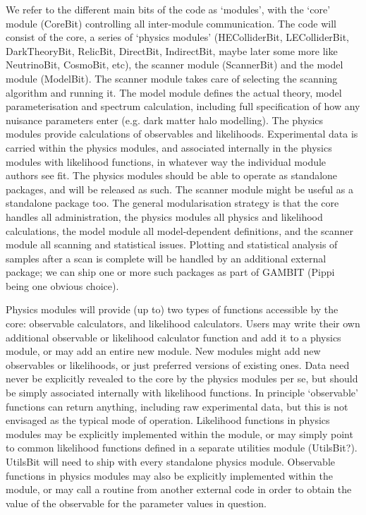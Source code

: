 We refer to the different main bits of the code as `modules', with the `core' module (CoreBit) controlling all inter-module communication.  The code will consist of the core, a series of `physics modules' (HEColliderBit, LEColliderBit, DarkTheoryBit, RelicBit, DirectBit, IndirectBit, maybe later some more like NeutrinoBit, CosmoBit, etc), the scanner module (ScannerBit) and the model module (ModelBit).  The scanner module takes care of selecting the scanning algorithm and running it.  The model module defines the actual theory, model parameterisation and spectrum calculation, including full specification of how any nuisance parameters enter (e.g. dark matter halo modelling).  The physics modules provide calculations of observables and likelihoods.  Experimental data is carried within the physics modules, and associated internally in the physics modules with likelihood functions, in whatever way the individual module authors see fit.  The physics modules should be able to operate as standalone packages, and will be released as such.  The scanner module might be useful as a standalone package too.  The general modularisation strategy is that the core handles all administration, the physics modules all physics and likelihood calculations, the model module all model-dependent definitions, and the scanner module all scanning and statistical issues.  Plotting and statistical analysis of samples after a scan is complete will be handled by an additional external package; we can ship one or more such packages as part of GAMBIT (Pippi being one obvious choice).

Physics modules will provide (up to) two types of functions accessible by the core: observable calculators, and likelihood calculators.  Users may write their own additional observable or likelihood calculator function and add it to a physics module, or may add an entire new module.  New modules might add new observables or likelihoods, or just preferred versions of existing ones.  Data need never be explicitly revealed to the core by the physics modules per se, but should be simply associated internally with likelihood functions.  In principle `observable' functions can return anything, including raw experimental data, but this is not envisaged as the typical mode of operation.  Likelihood functions in physics modules may be explicitly implemented within the module, or may simply point to common likelihood functions defined in a separate utilities module (UtilsBit?).  UtilsBit will need to ship with every standalone physics module.  Observable functions in physics modules may also be explicitly implemented within the module, or may call a routine from another external code in order to obtain the value of the observable for the parameter values in question.

